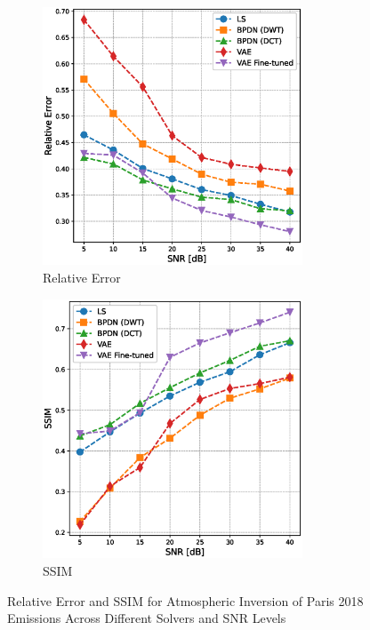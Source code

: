 \begin{figure}[htb]
    \centering
    \begin{subfigure}[b]{0.49\textwidth}
        \centering
        \includegraphics[width=0.85\textwidth]{figures/06_results/snr_plots/paris_relative_error.eps}
        \caption{Relative Error}
    \end{subfigure}
    \begin{subfigure}[b]{0.49\textwidth}
        \centering
        \includegraphics[width=0.85\textwidth]{figures/06_results/snr_plots/paris_ssim.eps}
        \caption{SSIM}
    \end{subfigure}
    \caption{Relative Error and SSIM for Atmospheric Inversion of Paris 2018 Emissions Across Different Solvers and SNR Levels}
    \label{fig:paris_results}
\end{figure}

